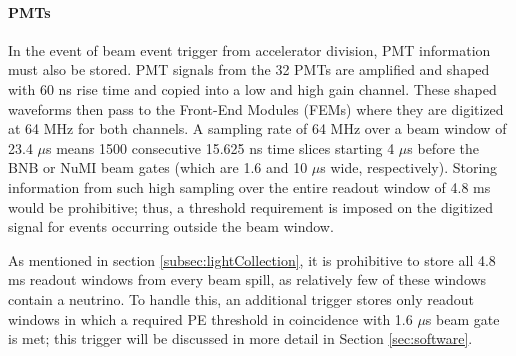 \documentclass[12pt]{article}
\begin{document}
\paragraph{PMTs}
In the event of beam event trigger from accelerator division, PMT information must also be stored. PMT signals from the 32 PMTs are amplified and shaped with 60 ns rise time and copied into a low and high gain channel. These shaped waveforms then pass to the Front-End Modules (FEMs) where they are digitized at 64 MHz for both channels. A sampling rate of 64 MHz over a beam window of 23.4 $\mu$s means 1500 consecutive 15.625 ns time slices starting 4 $\mu$s before the BNB or NuMI beam gates (which are 1.6 and 10 $\mu$s wide, respectively). Storing information from such high sampling over the entire readout window of 4.8 ms would be prohibitive; thus, a threshold requirement is imposed on the digitized signal for events occurring outside the beam window. \\
\par As mentioned in section \ref{subsec:lightCollection}, it is prohibitive to store all 4.8 ms readout windows from every beam spill, as relatively few of these windows contain a neutrino. To handle this, an additional trigger stores only readout windows in which a required PE threshold in coincidence with 1.6 $\mu$s beam gate is met; this trigger will be discussed in more detail in Section \ref{sec:software}.

\end{document}

